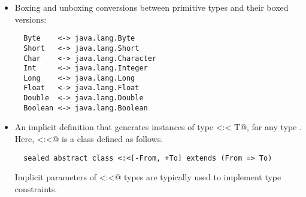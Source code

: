 \begin{itemize}
\item
Boxing and unboxing conversions between primitive types and their boxed versions:
\begin{lstlisting}
  Byte    <-> java.lang.Byte
  Short   <-> java.lang.Short
  Char    <-> java.lang.Character
  Int     <-> java.lang.Integer
  Long    <-> java.lang.Long
  Float   <-> java.lang.Float
  Double  <-> java.lang.Double
  Boolean <-> java.lang.Boolean
\end{lstlisting}
\item
An implicit definition that generates instances of type \lstinline@T <:< T@, for
any type \lstinline@T@. Here, \lstinline@<:<@ is a class defined as follows.
\begin{lstlisting}
  sealed abstract class <:<[-From, +To] extends (From => To)
\end{lstlisting}
Implicit parameters of \lstinline@<:<@ types are typically used to implement type constraints.
\end{itemize}


